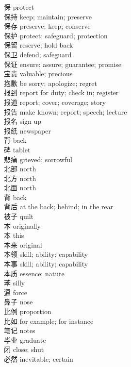 保 \quad protect\\
保持 \quad keep; maintain; preserve\\
保存 \quad preserve; keep; conserve\\
保护 \quad protect; safeguard; protection\\
保留 \quad reserve; hold back\\
保卫 \quad defend; safeguard\\
保证 \quad ensure; assure; guarantee; promise\\
宝贵 \quad valuable; precious\\
抱歉 \quad be sorry; apologize; regret\\
报到 \quad report for duty; check in; register\\
报道 \quad report; cover; coverage; story\\
报告 \quad make known; report; speech; lecture\\
报名 \quad sign up\\
报纸 \quad newspaper\\
背 \quad back\\
碑 \quad tablet\\
悲痛 \quad grieved; sorrowful\\
北部 \quad north\\
北方 \quad north\\
北面 \quad north\\
背 \quad back\\
背后 \quad at the back; behind; in the rear\\
被子 \quad quilt\\
本 \quad originally\\
本 \quad this\\
本来 \quad original\\
本领 \quad skill; ability; capability\\
本事 \quad skill; ability; capability\\
本质 \quad essence; nature\\
苯 \quad silly\\
逼 \quad force\\
鼻子 \quad nose\\
比例 \quad proportion\\
比如 \quad for example; for instance\\
笔记 \quad notes\\
毕业 \quad graduate\\
闭 \quad close; shut\\
必然 \quad inevitable; certain\\

